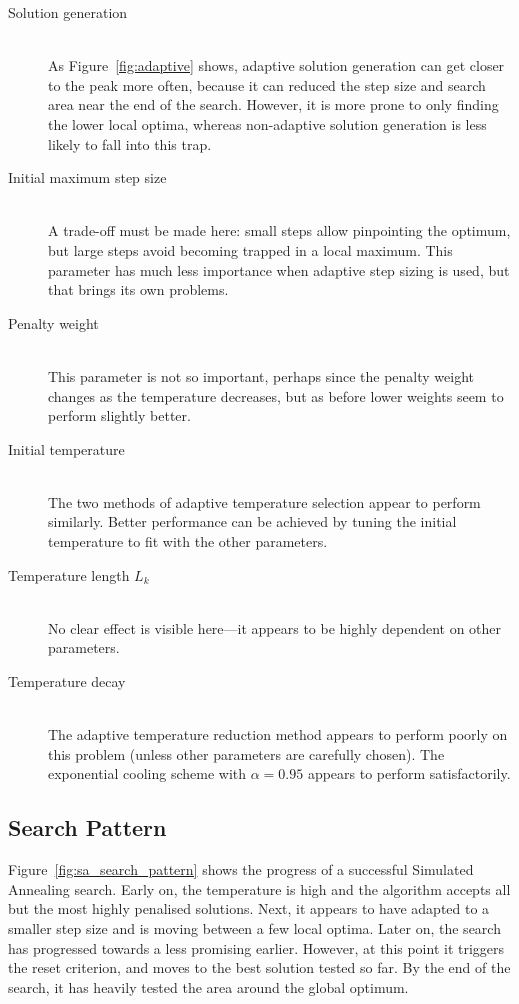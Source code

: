 \documentclass[10pt]{article}
\begin{document}
\begin{description}
  \item[Solution generation] \hfill \\
    As Figure~\ref{fig:adaptive} shows, adaptive solution generation can get
    closer to the peak more often, because it can reduced the step size and
    search area near the end of the search. However, it is more prone to only
    finding the lower local optima, whereas non-adaptive solution generation
    is less likely to fall into this trap.
  \item[Initial maximum step size] \hfill \\
    A trade-off must be made here: small steps allow pinpointing the optimum,
    but large steps avoid becoming trapped in a local maximum. This parameter
    has much less importance when adaptive step sizing is used, but that
    brings its own problems.
  \item[Penalty weight] \hfill \\
    This parameter is not so important, perhaps since the penalty weight
    changes as the temperature decreases, but as before lower weights seem to
    perform slightly better.
  \item[Initial temperature] \hfill \\
    The two methods of adaptive temperature selection appear to perform
    similarly. Better performance can be achieved by tuning the initial
    temperature to fit with the other parameters.
  \item[Temperature length $L_k$] \hfill \\
    No clear effect is visible here---it appears to be highly dependent on
    other parameters.
  \item[Temperature decay] \hfill \\
    The adaptive temperature reduction method appears to perform poorly on
    this problem (unless other parameters are carefully chosen). The
    exponential cooling scheme \cite{kirk82} with $\alpha = 0.95$
    appears to perform satisfactorily.
    \end{description}

\subsection{Search Pattern}

Figure~\ref{fig:sa_search_pattern} shows the progress of a successful
Simulated Annealing search. Early on, the temperature is high and the
algorithm accepts all but the most highly penalised solutions. Next, it
appears to have adapted to a smaller step size and is moving between a few
local optima. Later on, the search has progressed towards a less promising
earlier. However, at this point it triggers the reset criterion, and moves to
the best solution tested so far.  By the end of the search, it has heavily
tested the area around the global optimum.
\end{document}
